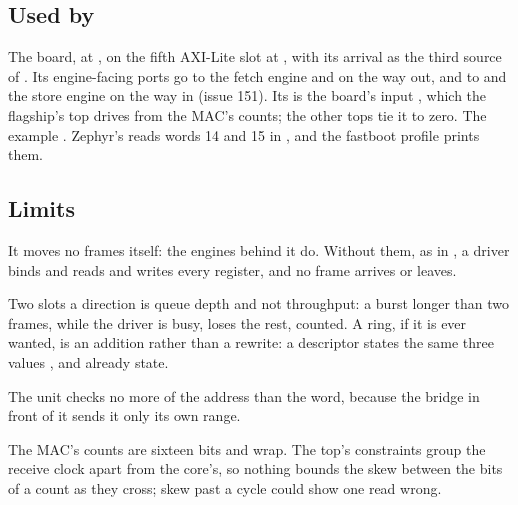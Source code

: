 \subsection*{Used by}

The board, at , on the fifth AXI-Lite
slot at , with its arrival as the third source of
. Its engine-facing ports go to the fetch engine and
 on the way out, and to  and the store
engine on the way in (issue 151). Its  is the board's
input , which the flagship's top drives from the
MAC's counts; the other tops tie it to zero. The example
. Zephyr's  reads words 14 and
15 in , and the fastboot profile prints
them.

\subsection*{Limits}

It moves no frames itself: the engines behind it do. Without them,
as in , a driver binds and reads and writes every
register, and no frame arrives or leaves.

Two slots a direction is queue depth and not throughput: a burst
longer than two frames, while the driver is busy, loses the rest,
counted. A ring, if
it is ever wanted, is an addition rather than a rewrite: a descriptor
states the same three values ,  and
 already state.

The unit checks no more of the address than the word, because the
bridge in front of it sends it only its own range.

The MAC's counts are sixteen bits and wrap. The top's constraints
group the receive clock apart from the core's, so nothing bounds the
skew between the bits of a count as they cross; skew past a cycle could
show one read wrong.
